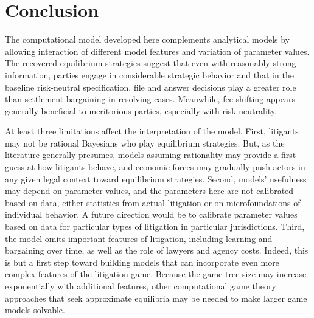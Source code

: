 \documentclass{article}
\begin{document}
\section{Conclusion}
\label{sec:conclusion}

The computational model developed here complements analytical models by allowing interaction of different model features and variation of parameter values. The recovered equilibrium strategies suggest that even with reasonably strong information, parties engage in considerable strategic behavior and that in the baseline risk-neutral specification, file and answer decisions play a greater role than settlement bargaining in resolving cases. Meanwhile, fee-shifting appears generally beneficial to meritorious parties, especially with risk neutrality.

At least three limitations affect the interpretation of the model. First, litigants may not be rational Bayesians who play equilibrium strategies. But, as the literature generally presumes, models assuming rationality may provide a first guess at how litigants behave, and economic forces may gradually push actors in any given legal context toward equilibrium strategies.  Second, models' usefulness may depend on parameter values, and the parameters here are not calibrated based on data, either statistics from actual litigation or on microfoundations of individual behavior. A future direction would be to calibrate parameter values based on data for particular types of litigation in particular jurisdictions. Third, the model omits important features of litigation, including learning and bargaining over time, as well as the role of lawyers and agency costs. Indeed, this is but a first step toward building models that can incorporate even more complex features of the litigation game. Because the game tree size may increase exponentially with additional features, other computational game theory approaches that seek approximate equilibria may be needed to make larger game models solvable.

\begingroup
\singlespacing
\small
\setlength{\bibitemsep}{0pt}
\printbibliography
\endgroup
\end{document}
